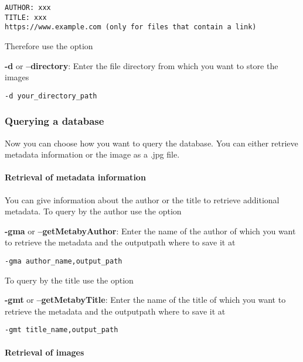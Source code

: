 \begin{verbatim}
AUTHOR: xxx
TITLE: xxx
https://www.example.com (only for files that contain a link)
\end{verbatim}

Therefore use the option

\textbf{-d} or \textbf{--directory}: Enter the file directory from which
you want to store the images

\begin{verbatim}
-d your_directory_path
\end{verbatim}

\hypertarget{querying-a-database}{%
\subsubsection{Querying a database}\label{querying-a-database}}

Now you can choose how you want to query the database. You can either
retrieve metadata information or the image as a .jpg file.

\hypertarget{retrieval-of-metadata-information}{%
\paragraph{\texorpdfstring{\textbf{Retrieval of metadata
information}}{Retrieval of metadata information}}\label{retrieval-of-metadata-information}}

You can give information about the author or the title to retrieve
additional metadata. To query by the author use the option

\textbf{-gma} or \textbf{--getMetabyAuthor}: Enter the name of the
author of which you want to retrieve the metadata and the outputpath
where to save it at

\begin{verbatim}
-gma author_name,output_path
\end{verbatim}

To query by the title use the option

\textbf{-gmt} or \textbf{--getMetabyTitle}: Enter the name of the title
of which you want to retrieve the metadata and the outputpath where to
save it at

\begin{verbatim}
-gmt title_name,output_path
\end{verbatim}

\hypertarget{retrieval-of-images}{%
\paragraph{\texorpdfstring{\textbf{Retrieval of
images}}{Retrieval of images}}\label{retrieval-of-images}}

